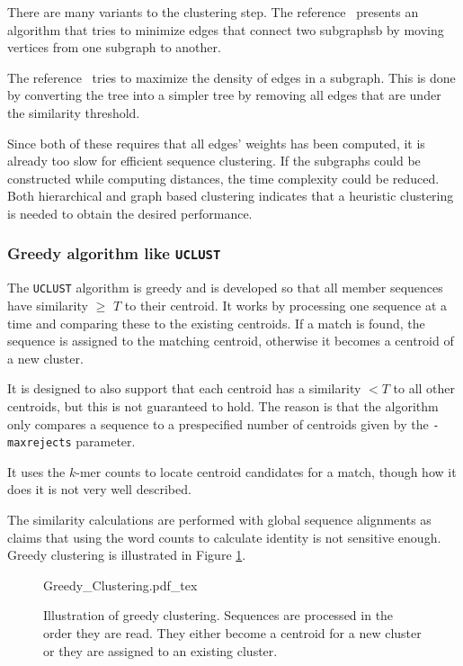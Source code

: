 There are many variants to the clustering step. The reference~\cite{hartuv}
presents an algorithm that tries to minimize edges that connect two subgraphsb by
moving vertices from one subgraph to another.

The reference~\cite{kawaji} tries to maximize the density of edges in a
subgraph. This is done by converting the tree into a simpler tree by removing
all edges that are under the similarity threshold.

Since both of these requires that all edges' weights has been computed, it is
already too slow for efficient sequence clustering. If the subgraphs could be
constructed while computing distances, the time complexity could be reduced.
Both hierarchical and graph based clustering indicates that a heuristic
clustering is needed to obtain the desired performance.


\subsubsection{Greedy algorithm like \texttt{UCLUST}}

The \texttt{UCLUST} algorithm is greedy and is developed so that all member
sequences have similarity $\geq$ $T$ to their centroid.  It works by processing
one sequence at a time and comparing these to the existing centroids. If a
match is found, the sequence is assigned to the matching centroid, otherwise it
becomes a centroid of a new cluster.

It is designed to also support that each centroid has a similarity $<T$ to all
other centroids, but this is not guaranteed to hold. The reason is that the
algorithm only compares a sequence to a prespecified number of centroids given
by the \texttt{-maxrejects} parameter.

It uses the $k$-mer counts to locate centroid candidates for a match, though
how it does it is not very well described.

The similarity calculations are performed with global sequence alignments as
\cite{usearch_algorithm} claims that using the word counts to calculate
identity is not sensitive enough. Greedy clustering is illustrated in Figure
\ref{fig:greedy_clustering}.

\begin{figure}[h!]
  \def\svgwidth{\columnwidth}
  {Greedy_Clustering.pdf_tex}
  \caption{Illustration of greedy clustering. Sequences are processed in the
    order they are read. They either become a centroid for a new cluster or
    they are assigned to an existing cluster.}
  \label{fig:greedy_clustering}
\end{figure}

